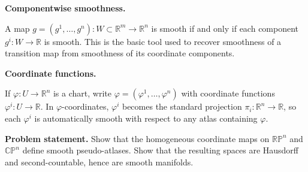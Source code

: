 \begin{solution}
\par\medskip\noindent\textbf{Componentwise smoothness.}\par\smallskip

A map $g=(g^1,\dots,g^n):W\subset\mathbb R^m\to\mathbb R^n$ is smooth if and only if each component
$g^i:W\to\mathbb R$ is smooth. This is the basic tool used to recover smoothness of a transition map from smoothness of
its coordinate components.

\par\medskip\noindent\textbf{Coordinate functions.}\par\smallskip

If $\varphi:U\to\mathbb R^n$ is a chart, write $\varphi=(\varphi^1,\dots,\varphi^n)$ with
coordinate functions $\varphi^i:U\to\mathbb R$.
In $\varphi$-coordinates, $\varphi^i$ becomes the standard projection $\pi_i:\mathbb R^n\to\mathbb R$,
so each $\varphi^i$ is automatically smooth with respect to any atlas containing $\varphi$.





\end{solution}

\begin{problem}
\label{prob:cp-vii-0006}

\noindent\textbf{Problem statement.}
Show that the homogeneous coordinate maps on $\mathbb{RP}^n$ and $\mathbb{CP}^n$ define smooth pseudo-atlases.
Show that the resulting spaces are Hausdorff and second-countable, hence are smooth manifolds.

\medskip
\end{problem}

